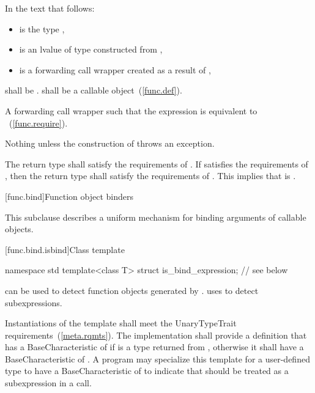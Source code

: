 \begin{itemdescr}
\pnum
In the text that follows:
\begin{itemize}
\item {} is the type ,
\item {} is an lvalue of type  constructed from ,
\item {} is a forwarding call wrapper created as a result of ,
\end{itemize}

\pnum \requires
{} shall be .
 shall be a callable object~(\ref{func.def}).

\pnum \returns
A forwarding call wrapper 
such that the expression
is equivalent to ~(\ref{func.require}).

\pnum \throws
Nothing unless the construction of  throws an exception.

\pnum \remarks
The return type shall satisfy the requirements of .
If  satisfies the requirements of ,
then the return type shall satisfy the requirements of .
\enternote This implies that  is . \exitnote
\end{itemdescr}

[func.bind]{Function object binders}%

\pnum
This subclause describes a uniform mechanism for binding
arguments of callable objects.

[func.bind.isbind]{Class template }

%
\begin{codeblock}
namespace std {
  template<class T> struct is_bind_expression; // see below
}
\end{codeblock}

\pnum
{} can be used to detect function objects
generated by . 
uses  to detect subexpressions.

\pnum
Instantiations of the  template shall meet
the UnaryTypeTrait requirements~(\ref{meta.rqmts}). The implementation
shall provide a definition that has a BaseCharacteristic of
 if  is a type returned from ,
otherwise it shall have a BaseCharacteristic of .
A program may specialize this template for a user-defined type 
to have a BaseCharacteristic of  to indicate that
 should be treated as a subexpression in a  call.

